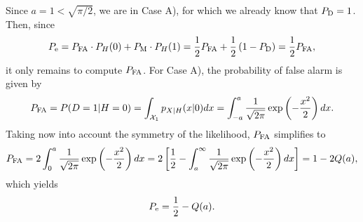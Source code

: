 \begin{parts}
\begin{solution}
  Since $a = 1 < \sqrt{\pi/2}$, we are in Case A), for which we already know that $P_{\text{D}} = 1$. Then, since
  \begin{equation*}
    P_{\text{e}} = P_{\text{FA}} \cdot P_{H}(0) + P_{\text{M}} \cdot P_{H}(1) = \frac{1}{2} P_{\text{FA}} + \frac{1}{2} \left(1 - P_{\text{D}}\right) = \frac{1}{2} P_{\text{FA}},
  \end{equation*}
  it only remains to compute $P_{\text{FA}}$. For Case A), the probability of false alarm is given by
  \begin{equation*}
    P_{\text{FA}} = P(D = 1 | H = 0) = \int_{\mathcal{X}_1} p_{X | H}(x | 0) d x = \int_{-a}^{a} \frac{1}{\sqrt{2 \pi}} \exp \left(- \frac{x^2}{2}\right) d x.
  \end{equation*}
  Taking now into account the symmetry of the likelihood, $P_{\text{FA}}$ simplifies to
  \begin{equation*}
    P_{\text{FA}} = 2 \int_{0}^{a} \frac{1}{\sqrt{2 \pi}} \exp \left(- \frac{x^2}{2}\right) d x = 2 \left[\frac{1}{2} - \int_{a}^{\infty} \frac{1}{\sqrt{2 \pi}} \exp \left(- \frac{x^2}{2}\right) d x\right] = 1 - 2 Q(a),
  \end{equation*}
  which yields
  \begin{equation*}
    P_{\text{e}} = \frac{1}{2} - Q(a).
  \end{equation*}
  
\end{solution}
  
\end{parts}


